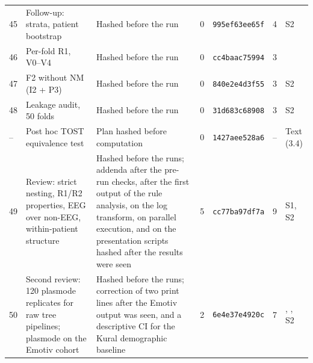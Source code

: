 \begin{table}[h]
\begin{tabular}{@{}lL{0.17\textwidth}L{0.28\textwidth}cL{0.14\textwidth}cL{0.14\textwidth}@{}}
45 & Follow-up: strata, patient bootstrap & Hashed before the run & 0 & \texttt{995ef63ee65f} & 4 & S2 \\
46 & Per-fold R1, V0--V4 & Hashed before the run & 0 & \texttt{cc4baac75994} & 3 &  \\
47 & F2 without NM (I2 + P3) & Hashed before the run & 0 & \texttt{840e2e4d3f55} & 3 & S2 \\
48 & Leakage audit, 50 folds & Hashed before the run & 0 & \texttt{31d683c68908} & 3 & S2 \\
-- & Post hoc TOST equivalence test & Plan hashed before computation & 0 & \texttt{1427aee528a6} & -- & Text (3.4) \\
49 & Review: strict nesting, R1/R2 properties, EEG over non-EEG, within-patient structure & Hashed before the runs; addenda after the pre-run checks, after the first output of the rule analysis, on the log transform, on parallel execution, and on the presentation scripts hashed after the results were seen & 5 & \texttt{cc77ba97df7a} & 9 & S1, S2 \\
50 & Second review: 120 plasmode replicates for raw tree pipelines; plasmode on the Emotiv cohort & Hashed before the runs; correction of two print lines after the Emotiv output was seen, and a descriptive CI for the Kural demographic baseline & 2 & \texttt{6e4e37e4920c} & 7 & , , S2 \\
\bottomrule
\end{tabular}
\end{table}

